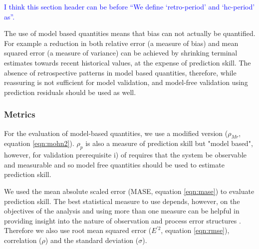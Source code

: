 \documentclass[12pt,halfline,a4paper,nonumbib]{ouparticle}
\newcommand{\toshi}{\textcolor{blue}}
\begin{document}
\toshi{I think this section header can be before ``We  define `retro-period' and `hc-period' as''.}

The use of model based quantities means that bias can not actually be quantified. For example a reduction in both relative error (a measure of bias) and mean squared error (a measure of variance) can be achieved by shrinking terminal estimates towards recent historical values, at the expense of prediction skill. The absence of retrospective patterns in model based quantities, therefore, while reassuring is not sufficient for model validation, and model-free validation using prediction residuals should be used as well.


\subsubsection{Metrics}

For the evaluation of model-based quantities, we use a modified version ($\rho_{Mr}$, equation \ref{eqn:mohn2}). $\rho_{p}$ is also a measure of prediction skill but "model based", however, for validation prerequisite i) of \cite{hodges1992you} requires that the system be observable and measurable and so model free quantities should be used to estimate prediction skill.

We used the mean absolute scaled error (MASE, equation \ref{eqn:mase}) to evaluate prediction skill. The best statistical measure to use depends, however, on the objectives of the analysis and using more than one measure can be helpful in providing insight into the nature of observation and process error structures \parencite{kell2016xval}. Therefore we also use root mean squared error ($E^{\prime 2}$, equation \ref{eqn:rmse}), correlation ($\rho$) and the standard deviation ($\sigma$). 
\end{document}
